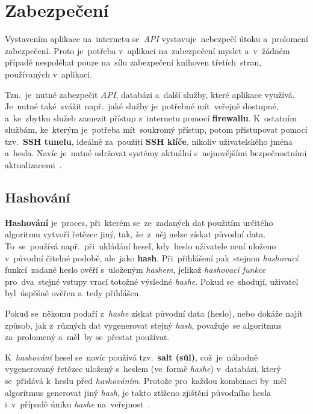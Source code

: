 \documentclass[11pt,a4paper]{report}
\let\oldacrshort\acrshort
\renewcommand{\acrshort}[1]{\emph{\normalsize\color[rgb]{0,0,0}\noindent\oldacrshort{#1}}}
\begin{document}
        \section{Zabezpečení}
            Vystavením aplikace na~internetu se~\acrshort{API} vystavuje~nebezpečí útoku a~prolomení zabezpečení. Proto je~potřeba v~aplikaci na~zabezpečení myslet a~v~žádném případě nespoléhat pouze na~sílu zabezpečení knihoven třetích~stran, používaných v~aplikaci.
            
            Tzn.~je~nutné zabezpečit \acrshort{API}, databázi a~další služby, které aplikace využívá. Je~nutné také~zvážit např.~jaké služby je~potřebné mít~veřejně dostupné, a~ke~zbytku služeb zamezit přístup z~internetu pomocí \textbf{firewallu}. K~ostatním službám, ke~kterým je~potřeba mít~soukromý přístup, potom přistupovat pomocí tzv.~\textbf{SSH tunelu}, ideálně za~použití \textbf{SSH klíče}, nikoliv uživatelského jména a~hesla. Navíc je~nutné udržovat systémy aktuální s~nejnovějšími bezpečnostními aktualizacemi~\cite{graham2021ethical, Dorman:webmappingajax}.
            
            \subsection{Hashování}
                \textbf{Hashování} je~proces, při~kterém se~ze~zadaných dat použitím určitého algoritmu vytvoří řetězec jiný, tak, že~z~něj nelze získat původní data. To~se~používá např.~při~ukládání hesel, kdy~heslo uživatele není uloženo v~původní čitelné podobě, ale~jako \textbf{hash}. Při~přihlášení pak~stejnou \emph{hashovací} funkcí~zadané heslo ověří s~uloženým \emph{hashem}, jelikož \emph{hashovací funkce} pro~dva~stejné vstupy vrací totožné výsledné \emph{hashe}. Pokud se~shodují, uživatel byl~úspěšně ověřen a~tedy přihlášen.
                
                Pokud se~někomu podaří z~\emph{hashe} získat původní data (heslo), nebo dokáže najít způsob, jak z~různých dat vygenerovat stejný \emph{hash}, považuje~se algoritmus za~prolomený a~měl~by se~přestat používat.
                
                K~\emph{hashování} hesel se~navíc používá tzv.~\textbf{salt (sůl)}, což~je~náhodně vygenerovaný řetězec uložený s~heslem (ve~formě \emph{hashe}) v~databázi, který se~přidává k~heslu před \emph{hashováním}. Protože pro~každou kombinaci by~měl algoritmus generovat jiný \emph{hash}, je takto ztíženo zjištění původního hesla i~v~případě úniku \emph{hashe} na~veřejnost~\cite{graham2021ethical}.
        
\end{document}
